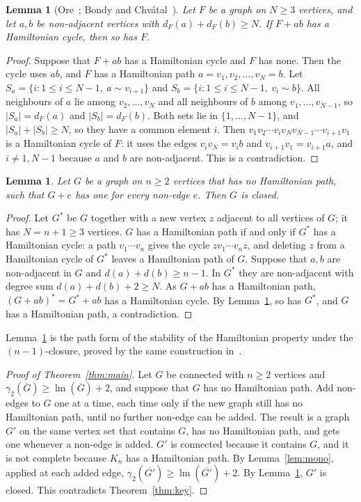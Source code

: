 \documentclass[11pt,a4paper]{article}
\newtheorem{lemma}[theorem]{Lemma}
\theoremstyle{remark}
\newcommand{\lm}{\operatorname{lm}}
\newcommand{\Gc}{\overline{G}}
\begin{document}
\begin{lemma}[Ore~\cite{ore}; Bondy and Chv\'atal~\cite{bc}]\label{lem:ore}
Let $F$ be a graph on $N\ge 3$ vertices, and let $a,b$ be non-adjacent vertices with
$d_F(a)+d_F(b)\ge N$. If $F+ab$ has a Hamiltonian cycle, then so has $F$.
\end{lemma}

\begin{proof}
Suppose that $F+ab$ has a Hamiltonian cycle and $F$ has none. Then the cycle uses $ab$, and
$F$ has a Hamiltonian path $a=v_1,v_2,\dots,v_N=b$. Let
$S_a=\{i: 1\le i\le N-1,\ a\sim v_{i+1}\}$ and $S_b=\{i:1\le i\le N-1,\ v_i\sim b\}$. All
neighbours of $a$ lie among $v_2,\dots,v_N$ and all neighbours of $b$ among
$v_1,\dots,v_{N-1}$, so $|S_a|=d_F(a)$ and $|S_b|=d_F(b)$. Both sets lie in $\{1,\dots,N-1\}$,
and $|S_a|+|S_b|\ge N$, so they have a common element $i$. Then
$v_1v_2\cdots v_iv_Nv_{N-1}\cdots v_{i+1}v_1$ is a Hamiltonian cycle of $F$: it uses the edges
$v_iv_N=v_ib$ and $v_{i+1}v_1=v_{i+1}a$, and $i\ne 1,N-1$ because $a$ and $b$ are
non-adjacent. This is a contradiction.
\end{proof}

\begin{lemma}\label{lem:closure}
Let $G$ be a graph on $n\ge 2$ vertices that has no Hamiltonian path, such that $G+e$ has one for
every non-edge $e$. Then $G$ is closed.
\end{lemma}

\begin{proof}
Let $G^*$ be $G$ together with a new vertex $z$ adjacent to all vertices of $G$; it has
$N=n+1\ge 3$ vertices. $G$ has a Hamiltonian path if and only if $G^*$ has a Hamiltonian cycle:
a path $v_1\cdots v_n$ gives the cycle $zv_1\cdots v_nz$, and deleting $z$ from a Hamiltonian
cycle of $G^*$ leaves a Hamiltonian path of $G$. Suppose that $a,b$ are non-adjacent in $G$ and
$d(a)+d(b)\ge n-1$. In $G^*$ they are non-adjacent with degree sum $d(a)+d(b)+2\ge N$. As $G+ab$
has a Hamiltonian path, $(G+ab)^*=G^*+ab$ has a Hamiltonian cycle. By Lemma~\ref{lem:ore}, so
has $G^*$, and $G$ has a Hamiltonian path, a contradiction.
\end{proof}

Lemma~\ref{lem:closure} is the path form of the stability of the Hamiltonian property under the
$(n-1)$-closure, proved by the same construction in~\cite[Theorem 9.4]{bc}.

\begin{proof}[Proof of Theorem~\ref{thm:main}]
Let $G$ be connected with $n\ge 2$ vertices and $\gamma_2(\Gc)\ge\lm(\Gc)+2$, and suppose that
$G$ has no Hamiltonian path. Add non-edges to $G$ one at a time, each time only if the new graph
still has no Hamiltonian path, until no further non-edge can be added. The result is a graph
$G'$ on the same vertex set that contains $G$, has no Hamiltonian path, and gets one whenever a
non-edge is added. $G'$ is connected because it contains $G$, and it is not complete because
$K_n$ has a Hamiltonian path. By Lemma~\ref{lem:mono}, applied at each added edge,
$\gamma_2(\overline{G'})\ge\lm(\overline{G'})+2$. By Lemma~\ref{lem:closure}, $G'$ is closed.
This contradicts Theorem~\ref{thm:key}.
\end{proof}
\end{document}
